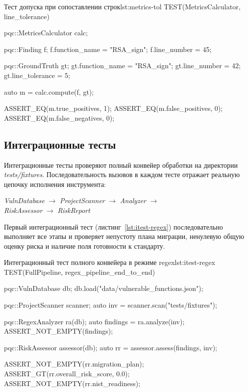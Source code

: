 \documentclass{itmo-vkr}
\newcommand{\code}[1]{\textit{#1}}
\begin{document}
\begin{itmolisting}[C++]{Тест допуска при сопоставлении строк}{lst:metrics-tol}
TEST(MetricsCalculator, line_tolerance) {
    pqc::MetricsCalculator calc;

    pqc::Finding f;
    f.function_name = "RSA_sign";
    f.line_number   = 45;

    pqc::GroundTruth gt;
    gt.function_name  = "RSA_sign";
    gt.line_number    = 42;
    gt.line_tolerance = 5;

    auto m = calc.compute({f}, {gt});

    ASSERT_EQ(m.true_positives,  1);
    ASSERT_EQ(m.false_positives, 0);
    ASSERT_EQ(m.false_negatives, 0);
}
\end{itmolisting}

\subsection{Интеграционные тесты}

Интеграционные тесты проверяют полный конвейер обработки
на директории \code{tests/\allowbreak fixtures}.
Последовательность вызовов в каждом тесте отражает реальную
цепочку исполнения инструмента:

\begin{center}
  \code{VulnDatabase} $\to$ \code{ProjectScanner} $\to$ \code{Analyzer} $\to$ \\
  \code{RiskAssessor} $\to$ \code{RiskReport}
\end{center}

Первый интеграционный тест (листинг~\ref{lst:itest-regex})
последовательно выполняет все этапы и проверяет непустоту
плана миграции, ненулевую общую оценку риска и наличие
поля готовности к стандарту.

\begin{itmolisting}[C++]{Интеграционный тест полного конвейера в режиме regex}{lst:itest-regex}
TEST(FullPipeline, regex_pipeline_end_to_end) {
    pqc::VulnDatabase db;
    db.load("data/vulnerable_functions.json");

    pqc::ProjectScanner scanner;
    auto inv = scanner.scan("tests/fixtures");

    pqc::RegexAnalyzer ra(db);
    auto findings = ra.analyze(inv);
    ASSERT_NOT_EMPTY(findings);

    pqc::RiskAssessor assessor(db);
    auto rr = assessor.assess(findings, inv);

    ASSERT_NOT_EMPTY(rr.migration_plan);
    ASSERT_GT(rr.overall_risk_score, 0.0);
    ASSERT_NOT_EMPTY(rr.nist_readiness);
}
\end{itmolisting}
\end{document}
